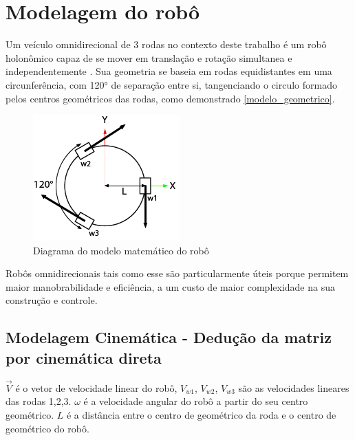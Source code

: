 
\section{Modelagem do robô}

Um veículo omnidirecional de 3 rodas no contexto deste trabalho é um robô
holonômico capaz de se mover em translação e rotação simultanea e
independentemente \cite{mobile_manipulator_robot}. Sua geometria se 
baseia em rodas equidistantes em uma circunferência, com 120° de separação entre
si, tangenciando o circulo formado pelos centros geométricos das rodas,
como demonstrado \autoref{modelo_geometrico}.

\begin{figure}[ht]
	\centering
	\caption{Diagrama do modelo matemático do robô}
	\label{modelo_geometrico}
	\includegraphics{figures/model}
\end{figure}

Robôs omnidirecionais tais como esse são particularmente úteis porque permitem
 maior manobrabilidade e eficiência, a um custo de maior complexidade na sua
 construção e controle. \cite{vectorial_speeds_simulations}

\subsection{Modelagem Cinemática - Dedução da matriz por cinemática direta}

$\overrightarrow{V}$ é o vetor de velocidade linear do robô, $V_{w1}$, $V_{w2}$,
$V_{w3}$ são as velocidades lineares das rodas 1,2,3. 
$\omega $ é a velocidade angular do robô a partir do seu centro geométrico.
$L$ é a distância entre o centro de geométrico da roda e o centro de geométrico
do robô.


